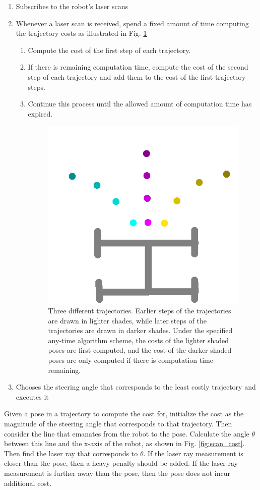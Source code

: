 \documentclass[final]{article}
\begin{document}
\begin{enumerate}
\item Subscribes to the robot's laser scans
\item Whenever a laser scan is received, spend a fixed amount of time computing the trajectory costs as illustrated in Fig. \ref{fig:any_time}
	\begin{enumerate}
	\item Compute the cost of the first step of each trajectory.
	\item If there is remaining computation time, compute the cost of the second step of each trajectory and add them to the cost of the first trajectory steps.
	\item Continue this process until the allowed amount of computation time has expired.
	\begin{figure}[h]
	\centering
	\includegraphics[width=0.4\linewidth]{figs/any_time.png}
	\caption{Three different trajectories. Earlier steps of the trajectories are drawn in lighter shades, while later steps of the trajectories are drawn in darker shades. Under the specified any-time algorithm scheme, the costs of the lighter shaded poses are first computed, and the cost of the darker shaded poses are only computed if there is computation time remaining.}
	\label{fig:any_time}
	\end{figure}
	\end{enumerate}
	\item Chooses the steering angle that corresponds to the least costly trajectory and executes it
\end{enumerate}

Given a pose in a trajectory to compute the cost for, initialize the cost as the magnitude of the steering angle that corresponds to that trajectory. Then consider the line that emanates from the robot to the pose. Calculate the angle $\theta$ between this line and the x-axis of the robot, as shown in Fig. \ref{fig:scan_cost}. Then find the laser ray that corresponds to $\theta$. If the laser ray measurement is closer than the pose, then a heavy penalty should be added. If the laser ray measurement is further away than the pose, then the pose does not incur additional cost. 
\end{document}
